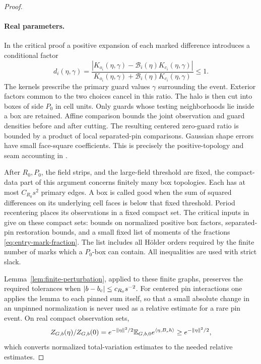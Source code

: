 \begin{proof}
\paragraph{Real parameters.}
In the critical proof a positive expansion of each marked difference
introduces a conditional factor
\begin{equation}\label{eq:entry-mark-fraction}
 d_i(\eta,\gamma)=
 \frac{|K_{o_i}(\eta,\gamma)-\mathcal B_i(\eta)K_{c_i}(\eta,\gamma)|}
      {K_{o_i}(\eta,\gamma)+\mathcal B_i(\eta)K_{c_i}(\eta,\gamma)}
                         \le1.
\end{equation}
The kernels prescribe the primary guard values $\gamma$ surrounding
the event.  Exterior factors common to the two choices cancel in this
ratio.  The halo is then cut into boxes of side $P_0$ in cell units.
Only guards whose testing neighborhoods lie inside a box are retained.
Affine comparison bounds the joint observation and guard densities
before and after cutting.  The resulting centered zero-guard ratio is
bounded by a product of local separated-pin comparisons.  Gaussian
shape errors have small face-square coefficients.  This is precisely
the positive-topology and seam accounting in
\cite[Equations~(71)--(74)]{F}.

After $R_0,P_0$, the field strips, and the large-field threshold are
fixed, the compact-data part of this argument concerns finitely many
box topologies.  Each has at most $C_{R_0}s^2$ primary edges.  A box is
called good when the sum of squared differences on its underlying cell
faces is below that fixed threshold.  Period recentering places its
observations in a fixed compact set.  The critical inputs in
\cite[Proposition~2.3 and Equations~(75)--(80)]{F} give on these compact sets: bounds on normalized positive
box factors, separated-pin restoration bounds, and a small fixed list
of moments of the fractions \eqref{eq:entry-mark-fraction}.  The list
includes all H\"older orders required by the finite number of marks
which a $P_0$-box can contain.  All inequalities are used with strict
slack.

Lemma~\ref{lem:finite-perturbation}, applied to these finite graphs,
preserves the required tolerances when
$|b-b_c|\le c_{R_0}s^{-2}$.  For centered pin interactions one applies
the lemma to each pinned sum itself, so that a small absolute change
in an unpinned normalization is never used as a relative estimate for
a rare pin event.  On real compact observation sets,
\[
 Z_{G,b}(\eta)/Z_{G,b}(0)
 =e^{-\|\eta\|^2/2}\mathbb E_{G,b,0}e^{\langle\eta,B_sh\rangle}
                       \ge e^{-\|\eta\|^2/2},
\]
which converts normalized total-variation estimates to the needed
relative estimates.


\end{proof}
